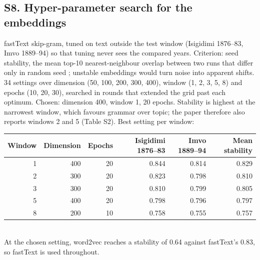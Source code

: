 \documentclass[10pt,letterpaper]{article}
\begin{document}
\subsection*{S8. Hyper-parameter search for the embeddings}
fastText skip-gram, tuned on text outside the test window (Isigidimi 1876--83, Imvo 1889--94) so that tuning never sees the compared years. Criterion: seed stability, the mean top-10 nearest-neighbour overlap between two runs that differ only in random seed \citep{antoniak2018}; unstable embeddings would turn noise into apparent shifts. 34 settings over dimension (50, 100, 200, 300, 400), window (1, 2, 3, 5, 8) and epochs (10, 20, 30), searched in rounds that extended the grid past each optimum. Chosen: dimension 400, window 1, 20 epochs. Stability is highest at the narrowest window, which favours grammar over topic; the paper therefore also reports windows 2 and 5 (Table S2). Best setting per window:\\[2pt]
\begin{tabular}{@{}rrrrrr@{}}
\toprule
Window & Dimension & Epochs & Isigidimi 1876--83 & Imvo 1889--94 & Mean stability \\ \midrule
1 & 400 & 20 & 0.844 & 0.814 & 0.829 \\
2 & 300 & 20 & 0.823 & 0.798 & 0.810 \\
3 & 300 & 20 & 0.810 & 0.799 & 0.805 \\
5 & 400 & 20 & 0.798 & 0.796 & 0.797 \\
8 & 200 & 10 & 0.758 & 0.755 & 0.757 \\
\bottomrule
\end{tabular}\\[2pt]
At the chosen setting, word2vec reaches a stability of 0.64 against fastText's 0.83, so fastText is used throughout.
\end{document}
